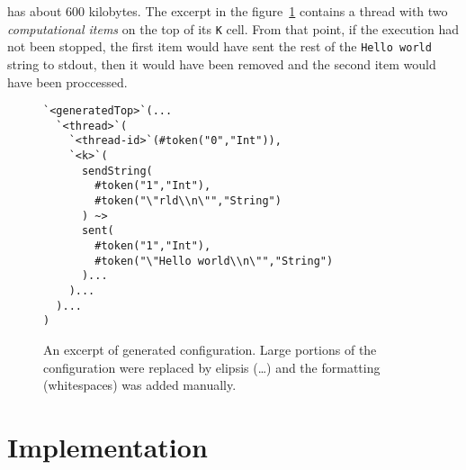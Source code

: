 \documentclass{fithesis3}
\begin{document}
has about 600 kilobytes. The excerpt in the figure~\ref{exampleConfigurationOutput} contains a thread with two \textit{computational items} on the top of its \texttt{K} cell. From that point, if the execution had not been stopped, the first item would have sent the rest of the \texttt{Hello world} string to stdout, then it would have been removed and the second item would have been proccessed.

\begin{figure}[h]
\begin{lstlisting}
`<generatedTop>`(...
  `<thread>`(
    `<thread-id>`(#token("0","Int")),
    `<k>`(
      sendString(
        #token("1","Int"),
        #token("\"rld\\n\"","String")
      ) ~>
      sent(
        #token("1","Int"),
        #token("\"Hello world\\n\"","String")
      )...
    )...
  )...
)
\end{lstlisting}
\caption{An excerpt of 
generated configuration.
Large portions of the configuration were replaced by elipsis (\ldots) and the formatting (whitespaces) was added manually.}
\label{exampleConfigurationOutput}
\end{figure}








\chapter{Implementation}
\end{document}
